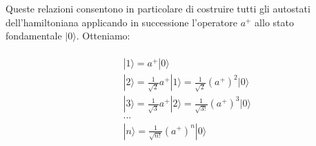 \documentclass[a4paper,12pt,oneside]{book}
\begin{document}
Queste relazioni consentono in particolare di costruire tutti gli autostati dell'hamiltoniana applicando in successione l'operatore $a^+$ allo stato fondamentale $|0\rangle$. Otteniamo:\\\\
\begin{eqnarray} \label{eq:cap11_10}  %
& &|1\rangle=a^+|0\rangle \nonumber \\
& &|2\rangle=\frac{1}{\sqrt{2}}a^+|1\rangle=\frac{1}{\sqrt{2}}(a^+)^2|0\rangle \nonumber \\
& &|3\rangle= \frac{1}{\sqrt{3}}a^+|2\rangle=\frac{1}{\sqrt{3!}}(a^+)^3|0\rangle   \\
& &... \nonumber\\
& &|n\rangle=\frac{1}{\sqrt{n!}}(a^+)^n|0\rangle \nonumber
\end{eqnarray}
\end{document}

